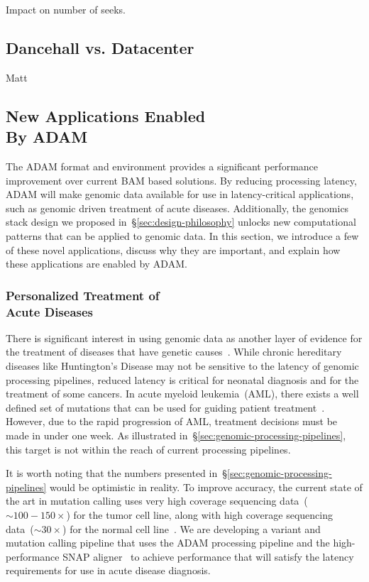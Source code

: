 \documentclass[10pt,twocolumn]{article}
\theoremstyle{plain}
\begin{document}
Impact on number of seeks.

\subsection{Dancehall vs. Datacenter}
\label{sec:dancehall-vs-datacenter}

Matt

\subsection{New Applications Enabled\\By ADAM}
\label{sec:new-applications}

The ADAM format and environment provides a significant performance improvement over current BAM based solutions. By reducing
processing latency, ADAM will make genomic data available for use in latency-critical applications, such as genomic driven treatment
of acute diseases. Additionally, the genomics stack design we proposed in~\S\ref{sec:design-philosophy} unlocks new computational
patterns that can be applied to genomic data. In this section, we introduce a few of these novel applications, discuss why they are important,
and explain how these applications are enabled by ADAM.

\subsubsection{Personalized Treatment of\\Acute Diseases}
\label{sec:personalized-acute-diseases}

There is significant interest in using genomic data as another layer of evidence for the treatment of diseases that have genetic
causes~\cite{ghosh09, van13}. While chronic hereditary diseases like Huntington's Disease may not be sensitive to the latency of genomic
processing pipelines, reduced latency is critical for neonatal diagnosis and for the treatment of some cancers. In acute myeloid
leukemia~(AML), there exists a well defined set of mutations that can be used for guiding patient treatment~\cite{smith12}. However,
due to the rapid progression of AML, treatment decisions must be made in under one week. As illustrated
in~\S\ref{sec:genomic-processing-pipelines}, this target is not within the reach of current processing pipelines.

It is worth noting that the numbers presented in~\S\ref{sec:genomic-processing-pipelines} would be optimistic in reality. To improve
accuracy, the current state of the art in mutation calling uses very high coverage sequencing data~($\sim100-150\times$) for the
tumor cell line, along with high coverage sequencing data~($\sim30\times$) for the normal cell line~\cite{cibulskis13}. We are
developing a variant and mutation calling pipeline that uses the ADAM processing pipeline and the high-performance SNAP
aligner~\cite{zaharia11} to achieve performance that will satisfy the latency requirements for use in acute disease diagnosis.
\end{document}
